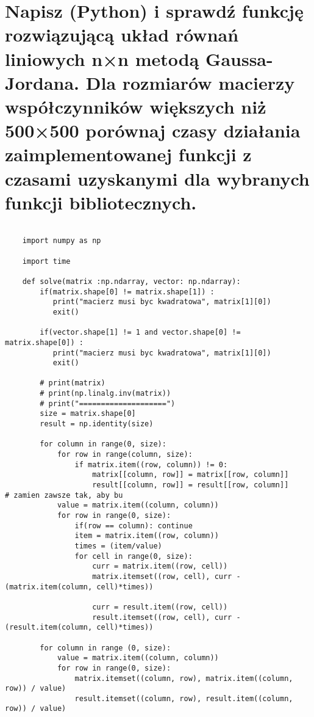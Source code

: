 
\section{Napisz (Python) i sprawdź funkcję rozwiązującą układ równań liniowych n×n metodą Gaussa-Jordana. Dla rozmiarów macierzy współczynników większych niż 500×500 porównaj czasy działania zaimplementowanej funkcji z czasami uzyskanymi dla wybranych funkcji bibliotecznych.}

\begin{verbatim}

    import numpy as np 

    import time
    
    def solve(matrix :np.ndarray, vector: np.ndarray):
        if(matrix.shape[0] != matrix.shape[1]) :
           print("macierz musi byc kwadratowa", matrix[1][0])
           exit()
    
        if(vector.shape[1] != 1 and vector.shape[0] != matrix.shape[0]) :
           print("macierz musi byc kwadratowa", matrix[1][0])
           exit()
    
        # print(matrix)
        # print(np.linalg.inv(matrix))
        # print("====================")
        size = matrix.shape[0]
        result = np.identity(size)
    
        for column in range(0, size):
            for row in range(column, size):
                if matrix.item((row, column)) != 0:
                    matrix[[column, row]] = matrix[[row, column]]
                    result[[column, row]] = result[[row, column]]                 # zamien zawsze tak, aby bu
            value = matrix.item((column, column))
            for row in range(0, size):
                if(row == column): continue
                item = matrix.item((row, column))
                times = (item/value)
                for cell in range(0, size):
                    curr = matrix.item((row, cell))
                    matrix.itemset((row, cell), curr - (matrix.item(column, cell)*times))
                    
                    curr = result.item((row, cell))
                    result.itemset((row, cell), curr - (result.item(column, cell)*times))
    
        for column in range (0, size):
            value = matrix.item((column, column))
            for row in range(0, size):
                matrix.itemset((column, row), matrix.item((column, row)) / value)
                result.itemset((column, row), result.item((column, row)) / value)
    

\end{verbatim}
